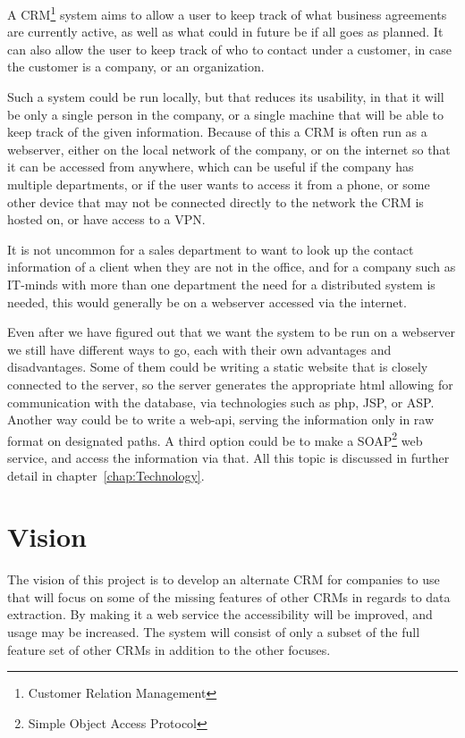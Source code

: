 A CRM\footnote{Customer Relation Management} system aims to allow a user to keep track of what business agreements are currently active, as well as what could in future be if all goes as planned. It can also allow the user to keep track of who to contact under a customer, in case the customer is a company, or an organization.

Such a system could be run locally, but that reduces its usability, in that it will be only a single person in the company, or a single machine that will be able to keep track of the given information. Because of this a CRM is often run as a webserver, either on the local network of the company, or on the internet so that it can be accessed from anywhere, which can be useful if the company has multiple departments, or if the user wants to access it from a phone, or some other device that may not be connected directly to the network the CRM is hosted on, or have access to a VPN.

It is not uncommon for a sales department to want to look up the contact information of a client when they are not in the office, and for a company such as IT-minds with more than one department the need for a distributed system is needed, this would generally be on a webserver accessed via the internet.

Even after we have figured out that we want the system to be run on a webserver we still have different ways to go, each with their own advantages and disadvantages. Some of them could be writing a static website that is closely connected to the server, so the server generates the appropriate html allowing for communication with the database, via technologies such as php, JSP, or ASP. Another way could be to write a web-api, serving the information only in raw format on designated paths. A third option could be to make a SOAP\footnote{Simple Object Access Protocol} web service, and access the information via that. All this topic is discussed in further detail in chapter~\ref{chap:Technology}.

\section{Vision}
\label{sec:Vision}
The vision of this project is to develop an alternate CRM for companies to use that will focus on some of the missing features of other CRMs in regards to data extraction. By making it a web service the accessibility will be improved, and usage may be increased. The system will consist of only a subset of the full feature set of other CRMs in addition to the other focuses.

